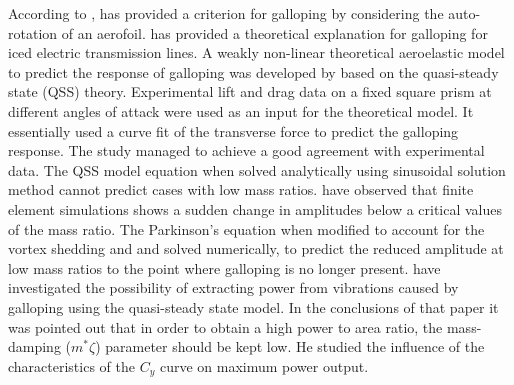 According to \cite{Paidoussis2010}, \cite{Glauert1919} has provided a criterion for galloping by considering the auto-rotation of an aerofoil.  \cite{DenHartog1956}  has provided a theoretical explanation for galloping for iced electric transmission lines. A weakly non-linear theoretical aeroelastic model to predict the response of galloping was developed by \cite{Parkinson1964} based on the quasi-steady state (QSS) theory. Experimental lift and drag data on a fixed square prism at different angles of attack were used as an input for the theoretical model. It essentially used a curve fit of the transverse force to predict the galloping response. The study managed to achieve a good agreement with experimental data. The QSS model equation when solved analytically using sinusoidal solution method cannot predict cases with low mass ratios. \cite{Joly2012} have observed that finite element simulations shows a sudden change in amplitudes  below a critical values of the mass ratio. The Parkinson's equation when modified to account for the vortex shedding and and solved numerically, to predict the reduced amplitude at low mass ratios to the point where galloping is no longer present. \cite{Barrero-Gil2010a} have investigated the possibility of extracting power from vibrations caused by galloping using the quasi-steady state model. In the conclusions of that paper it was pointed out that in order to obtain a high power to area ratio, the mass-damping ($m^*\zeta$) parameter should be kept low. He studied the influence of the characteristics of the $C_y$ curve on maximum power output.  